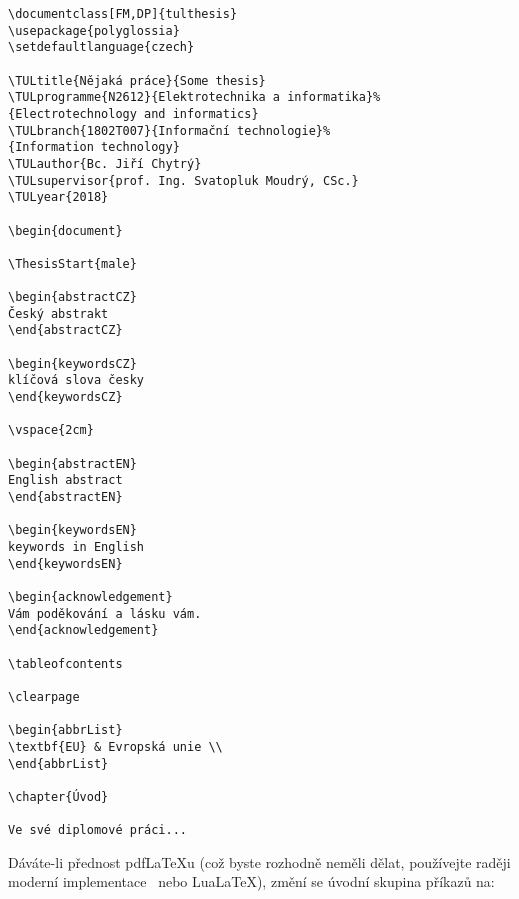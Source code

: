 \documentclass[FM,DP,fonts]{tulthesis}
\newenvironment{myquote}{\begin{list}{}{\setlength\leftmargin\parindent}\item[]}{\end{list}}
\newenvironment{listing}{\begin{myquote}\color{\tulcolor}}{\end{myquote}}
\begin{document}
\begin{listing}
\begin{verbatim}
\documentclass[FM,DP]{tulthesis}
\usepackage{polyglossia}
\setdefaultlanguage{czech}

\TULtitle{Nějaká práce}{Some thesis}
\TULprogramme{N2612}{Elektrotechnika a informatika}%
{Electrotechnology and informatics}
\TULbranch{1802T007}{Informační technologie}%
{Information technology}
\TULauthor{Bc. Jiří Chytrý}
\TULsupervisor{prof. Ing. Svatopluk Moudrý, CSc.}
\TULyear{2018}

\begin{document}

\ThesisStart{male}

\begin{abstractCZ}
Český abstrakt
\end{abstractCZ}

\begin{keywordsCZ}
klíčová slova česky
\end{keywordsCZ}

\vspace{2cm}

\begin{abstractEN}
English abstract
\end{abstractEN}

\begin{keywordsEN}
keywords in English
\end{keywordsEN}

\begin{acknowledgement}
Vám poděkování a lásku vám.
\end{acknowledgement}

\tableofcontents

\clearpage

\begin{abbrList}
\textbf{EU} & Evropská unie \\
\end{abbrList}

\chapter{Úvod}

Ve své diplomové práci...
\end{verbatim}
\end{listing}

Dáváte-li přednost pdf\LaTeX u (což byste rozhodně neměli dělat, používejte raději
moderní implementace \XeLaTeX\ nebo Lua\LaTeX), změní se úvodní skupina příkazů na:
\end{document}
